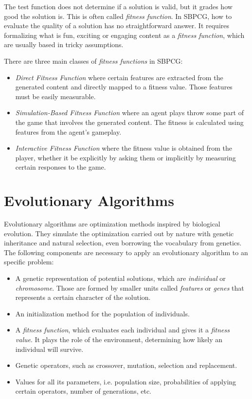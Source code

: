 The test function does not determine if a solution is valid, but it grades how good the solution is. This is often called \textit{fitness function}. In \ac{SBPCG}, how to evaluate the quality of a solution has no straightforward answer. It requires formalizing what is fun, exciting or engaging content as a \textit{fitness function}, which are usually based in tricky assumptions.

There are three main classes of \textit{fitness functions} in \ac{SBPCG}\cite{togelius2010search}:

\begin{itemize}
	\item \textit{Direct Fitness Function} where certain features are extracted from the generated content and directly mapped to a fitness value. Those features must be easily measurable.
	\item \textit{Simulation-Based Fitness Function} where an agent plays throw some part of the game that involves the generated content. The fitness is calculated using features from the agent's gameplay. 
	\item \textit{Interactive Fitness Function} where the fitness value is obtained from the player, whether it be explicitly by asking them or implicitly by measuring certain responses to the game. 
\end{itemize}


\section{Evolutionary Algorithms}\label{s:EAoverview}

Evolutionary algorithms are optimization methods inspired by biological evolution. They simulate the optimization carried out by nature with genetic inheritance and natural selection, even borrowing the vocabulary from genetics. The following components are necessary to apply an evolutionary algorithm to an specific problem:
\begin{itemize}
	\item A genetic representation of potential solutions, which are \textit{individual} or \textit{chromosome}. Those are formed by smaller units called \textit{features} or \textit{genes} that represents a certain character of the solution.
	\item An initialization method for the population of individuals.
	\item A \textit{fitness function}, which evaluates each individual and gives it a \textit{fitness value}. It plays the role of the environment, determining how likely an individual will survive.
	\item Genetic operators, such as crossover, mutation, selection and replacement.
	\item Values for all its parameters, i.e. population size, probabilities of applying certain operators, number of generations, etc.
\end{itemize}

